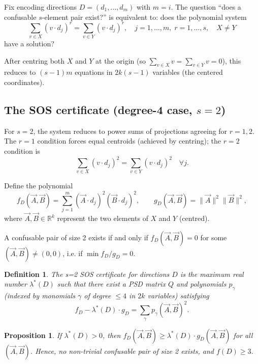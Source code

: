 \documentclass[12pt,a4paper]{article}
\newtheorem{definition}{Definition}
\newtheorem{proposition}{Proposition}
\begin{document}
Fix encoding directions $D = (d_1, \ldots, d_m)$ with $m = i$.  The question
``does a confusable $s$-element pair exist?'' is equivalent to: does the
polynomial system
\begin{equation}
  \label{eq:confusable-system}
  \sum_{v \in X} (v \cdot d_j)^r = \sum_{v \in Y} (v \cdot d_j)^r,
  \quad j=1,\ldots,m,\; r=1,\ldots,s,\quad X \neq Y
\end{equation}
have a solution?

After centring both $X$ and $Y$ at the origin (so $\sum_{v \in X} v = \sum_{v \in Y} v = 0$),
this reduces to $(s-1)m$ equations in $2k(s-1)$ variables (the centered coordinates).

\subsection*{The SOS certificate (degree-4 case, $s=2$)}

For $s=2$, the system reduces to power sums of projections agreeing for $r=1, 2$.
The $r=1$ condition forces equal centroids (achieved by centring); the $r=2$ condition is
\[
  \sum_{v \in X} (v \cdot d_j)^2 = \sum_{v \in Y} (v \cdot d_j)^2 \quad \forall j.
\]

Define the polynomial
\[
  f_D(\vec{A}, \vec{B})
  = \sum_{j=1}^m (\vec{A} \cdot d_j)^2 (\vec{B} \cdot d_j)^2,
  \qquad
  g_D(\vec{A}, \vec{B}) = \|\vec{A}\|^2 \|\vec{B}\|^2,
\]
where $\vec{A}, \vec{B} \in \mathbb{R}^k$ represent the two elements of $X$ and $Y$ (centred).

A confusable pair of size 2 exists if and only if $f_D(\vec{A}, \vec{B}) = 0$ for some
$(\vec{A}, \vec{B}) \neq (0, 0)$, i.e. if $\min f_D / g_D = 0$.

\begin{definition}
  The \emph{s=2 SOS certificate} for directions $D$ is the maximum real number
  $\lambda^*(D)$ such that there exist a PSD matrix $Q$ and polynomials $p_\gamma$
  (indexed by monomials $\gamma$ of degree $\leq 4$ in $2k$ variables) satisfying
  \[
    f_D - \lambda^*(D) \cdot g_D = \sum_\gamma p_\gamma(\vec{A}, \vec{B})^2.
  \]
\end{definition}

\begin{proposition}
  \label{prop:sos-lower-bound}
  If $\lambda^*(D) > 0$, then $f_D(\vec{A}, \vec{B}) \geq \lambda^*(D) \cdot g_D(\vec{A}, \vec{B})$
  for all $(\vec{A}, \vec{B})$.  Hence, no non-trivial confusable pair of size 2 exists,
  and $f(D) \geq 3$.
\end{proposition}
\end{document}
